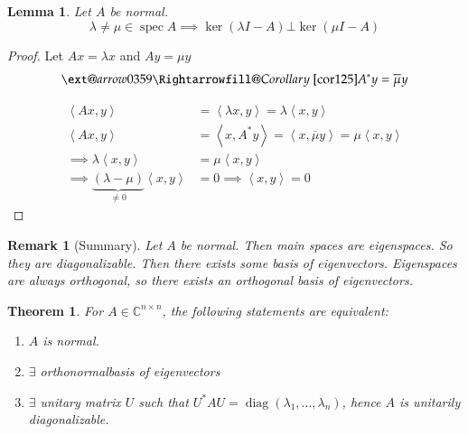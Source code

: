 \documentclass{article}
\makeatletter
\newtheorem{theorem}{Theorem}  \numberwithin{theorem}{section}
\newtheorem{lemma}{Lemma}  \numberwithin{lemma}{section}
\newtheorem{remark}{Remark}  \numberwithin{remark}{section}
\newcommand{\angel}[1]{\left\langle#1\right\rangle}
\newcommand{\xRightarrow}[2][]{\ext@arrow 0359\Rightarrowfill@{#1}{#2}}
\makeatother
\begin{document}
\begin{lemma} %
  Let $A$ be normal.
  \[ \lambda \neq \mu \in \operatorname{spec}{A} \implies \ker(\lambda I - A) \bot \ker(\mu I - A) \]
\end{lemma}

\begin{proof}
  Let $Ax = \lambda x$ and $Ay = \mu y$
  \[ \xRightarrow{Corollary~\ref{cor125}} A^* y = \overline{\mu} y \]

  \begin{align*}
    \angel{Ax,y} &= \angel{\lambda x, y} = \lambda \angel{x,y} \\
    \angel{Ax,y} &= \angel{x, A^* y} = \angel{x, \overline{\mu} y} = \mu \angel{x,y} \\
    \implies \lambda \angel{x,y} &= \mu \angel{x,y} \\
    \implies \underbrace{(\lambda - \mu)}_{\neq 0} \angel{x,y} &= 0 \implies \angel{x,y} = 0
  \end{align*}
\end{proof}

\begin{remark}[Summary]
  Let $A$ be normal. Then main spaces are eigenspaces.
  So they are diagonalizable. Then there exists some basis of eigenvectors.
  Eigenspaces are always orthogonal, so there exists an orthogonal basis of eigenvectors.
\end{remark}

\begin{theorem} %
  For $A \in \mathbb C^{n \times n}$, the following statements are equivalent:
  \begin{enumerate}
    \item $A$ is normal.
    \item $\exists$ orthonormalbasis of eigenvectors
    \item $\exists$ unitary matrix $U$ such that $U^* AU = \operatorname{diag}(\lambda_1, \dots, \lambda_n)$,
      hence $A$ is unitarily diagonalizable.
  \end{enumerate}
\end{theorem}
\end{document}
